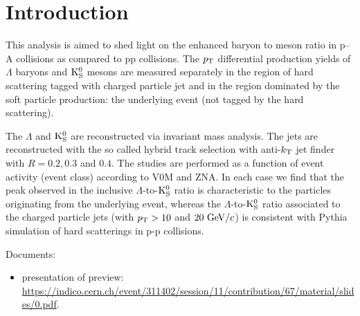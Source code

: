 \section{Introduction}

This analysis is aimed to shed light on the enhanced baryon to meson ratio
in p--A collisions as compared to pp collisions.
The $p_{\rm T}$ differential production yields of $\Lambda$ baryons
and ${\rm K}_{\rm S}^{0}$ mesons are measured separately in the region of
hard scattering tagged with charged particle jet and in the region dominated
by the soft particle production: the underlying
event (not tagged by the hard scattering).

The $\Lambda$ and ${\rm K}_{\rm S}^{0}$ are reconstructed via invariant mass
analysis.
The jets are reconstructed with the so called hybrid track selection with
anti-$k_{\rm T}$ jet finder with $R=0.2, 0.3$ and $0.4$.
The studies are performed as a function of event activity (event class)
according to V0M and ZNA.
In each case we find that the peak observed in the
inclusive $\Lambda$-to-${\rm K}_{\rm S}^{0}$ ratio is characteristic to the
particles originating from the underlying event,
whereas the $\Lambda$-to-${\rm K}_{\rm S}^{0}$ ratio associated to the
charged particle jets (with $p_{\rm T}>10$ and $20~{\rm GeV}/c$) is consistent
with Pythia simulation of hard scatterings in p-p collisions.

Documents:
\begin{itemize}
\item presentation of preview:
\href{https://indico.cern.ch/event/311402/session/11/contribution/67/material/slides/0.pdf}
     {https://indico.cern.ch/event/311402/session/11/contribution/67/material/slides/0.pdf}.
\end{itemize}
